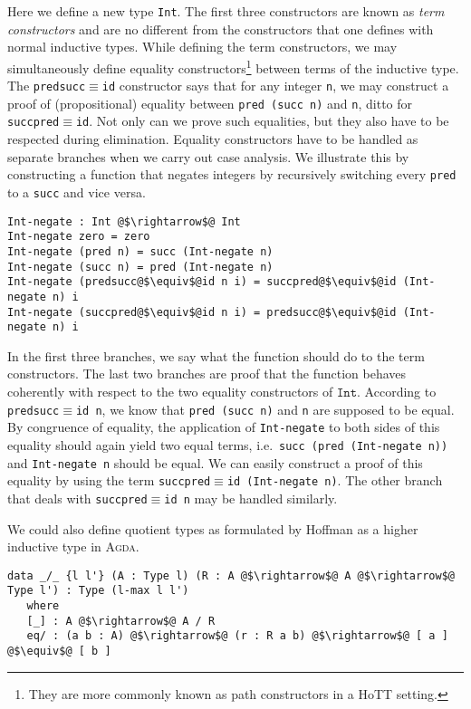 \documentclass[12pt,twoside,maitrise]{dms}
\theoremstyle{definition}
\numberwithin{equation}{section}
\numberwithin{table}{chapter}
\numberwithin{figure}{chapter}
\newcommand\id[1] {\texttt{#1}}
\newcommand\fn[1] {\texttt{#1}}
\def\Agda{\textsc{Agda}\xspace}
\begin{document}
Here we define a new type \id{Int}. The first three constructors are known as
\emph{term constructors} and are no different from the constructors that one
defines with normal inductive types. While defining the term constructors, we
may simultaneously define equality constructors\footnote{They are more commonly
known as path constructors in a HoTT setting.} between terms of the inductive
type. The \id{predsucc$\equiv$id} constructor says that for any integer \id{n},
we may construct a proof of (propositional) equality between \fn{pred (succ n)}
and \id{n}, ditto for \id{succpred$\equiv$id}. Not only can we prove such
equalities, but they also have to be respected during elimination. Equality
constructors have to be handled as separate branches when we carry out case
analysis. We illustrate this by constructing a function that negates integers by
recursively switching every \id{pred} to a \id{succ} and vice versa.

\begin{verbatim}
Int-negate : Int @$\rightarrow$@ Int
Int-negate zero = zero
Int-negate (pred n) = succ (Int-negate n)
Int-negate (succ n) = pred (Int-negate n)
Int-negate (predsucc@$\equiv$@id n i) = succpred@$\equiv$@id (Int-negate n) i
Int-negate (succpred@$\equiv$@id n i) = predsucc@$\equiv$@id (Int-negate n) i
\end{verbatim}

In the first three branches, we say what the function should do to the term
constructors. The last two branches are proof that the function behaves
coherently with respect to the two equality constructors of $\id{Int}$.
According to \fn{predsucc$\equiv$id n}, we know that \fn{pred (succ n)} and
\fn{n} are supposed to be equal. By congruence of equality, the application of
\id{Int-negate} to both sides of this equality should again yield two equal
terms, i.e.\ \fn{succ (pred (Int-negate n))} and \fn{Int-negate n} should be
equal. We can easily construct a proof of this equality by using the term
\fn{succpred$\equiv$id (Int-negate n)}. The other branch that deals with
\fn{succpred$\equiv$id n} may be handled similarly.

We could also define quotient types as formulated by
Hoffman\cite{hofmann1995extensional} as a higher inductive type in \Agda{}.

\begin{verbatim}
data _/_ {l l'} (A : Type l) (R : A @$\rightarrow$@ A @$\rightarrow$@ Type l') : Type (l-max l l')
   where
   [_] : A @$\rightarrow$@ A / R
   eq/ : (a b : A) @$\rightarrow$@ (r : R a b) @$\rightarrow$@ [ a ] @$\equiv$@ [ b ]
\end{verbatim}
\end{document}
